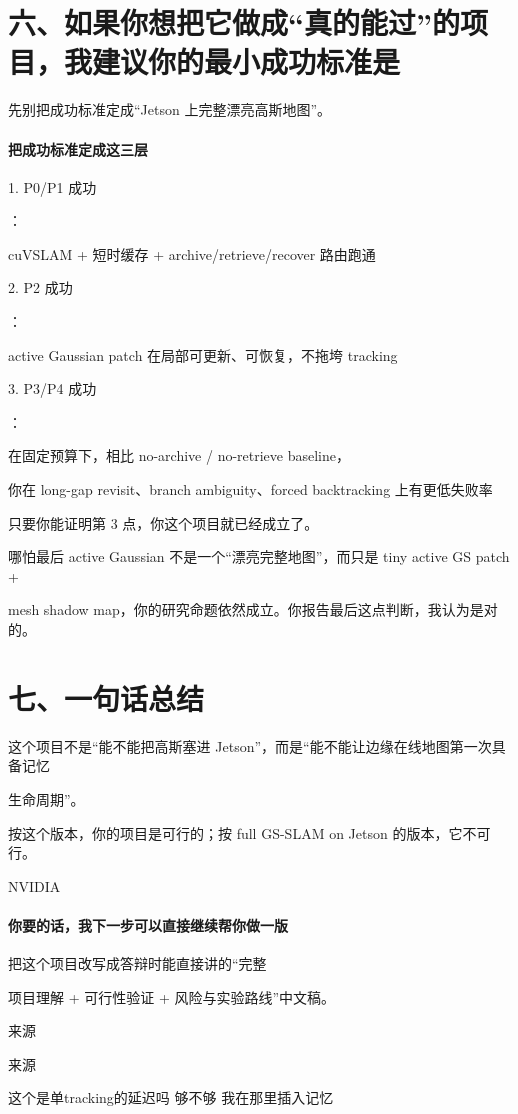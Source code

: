 \documentclass[12pt]{article}
\begin{document}
\section{六、如果你想把它做成“真的能过”的项目，我建议你的最小成功标准是}
先别把成功标准定成“Jetson 上完整漂亮高斯地图”。

\paragraph{把成功标准定成这三层}
1. P0/P1 成功

：

cuVSLAM + 短时缓存 + archive/retrieve/recover 路由跑通

2. P2 成功

：

active Gaussian patch 在局部可更新、可恢复，不拖垮 tracking

3. P3/P4 成功

：

在固定预算下，相比 no-archive / no-retrieve baseline，

你在 long-gap revisit、branch ambiguity、forced backtracking 上有更低失败率

只要你能证明第 3 点，你这个项目就已经成立了。

哪怕最后 active Gaussian 不是一个“漂亮完整地图”，而只是 tiny active GS patch +

mesh shadow map，你的研究命题依然成立。你报告最后这点判断，我认为是对的。

\section{七、一句话总结}
这个项目不是“能不能把高斯塞进 Jetson”，而是“能不能让边缘在线地图第一次具备记忆

生命周期”。

按这个版本，你的项目是可行的；按 full GS-SLAM on Jetson 的版本，它不可行。

NVIDIA

\paragraph{你要的话，我下一步可以直接继续帮你做一版}
把这个项目改写成答辩时能直接讲的“完整

项目理解 + 可行性验证 + 风险与实验路线”中文稿。

来源

来源

这个是单tracking的延迟吗 够不够 我在那里插入记忆
\end{document}
